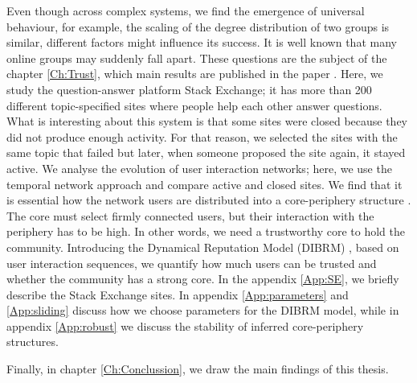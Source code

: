 Even though across complex systems, we find the emergence of universal behaviour, for example, the scaling of the degree distribution of two groups is similar, different factors might influence its success. It is well known that many online groups may suddenly fall apart. These questions are the subject of the chapter \ref{Ch:Trust}, which main results are published in the paper \cite{vranic2022sustainability}. Here, we study the question-answer platform Stack Exchange; it has more than 200 different topic-specified sites where people help each other answer questions. What is interesting about this system is that some sites were closed because they did not produce enough activity. For that reason, we selected the sites with the same topic that failed but later, when someone proposed the site again, it stayed active. We analyse the evolution of user interaction networks; here, we use the temporal network approach and compare active and closed sites. We find that it is essential how the network users are distributed into a core-periphery structure \cite{gallagher2020clarified}. The core must select firmly connected users, but their interaction with the periphery has to be high. In other words, we need a trustworthy core to hold the community. Introducing the Dynamical Reputation Model (DIBRM) \cite{melnikov2018toward}, based on user interaction sequences, we quantify how much users can be trusted and whether the community has a strong core. In the appendix \ref{App:SE}, we briefly describe the Stack Exchange sites. In appendix \ref{App:parameters} and \ref{App:sliding} discuss how we choose parameters for the DIBRM model, while in appendix \ref{App:robust} we discuss the stability of inferred core-periphery structures. 

Finally, in chapter \ref{Ch:Conclussion}, we draw the main findings of this thesis. 















